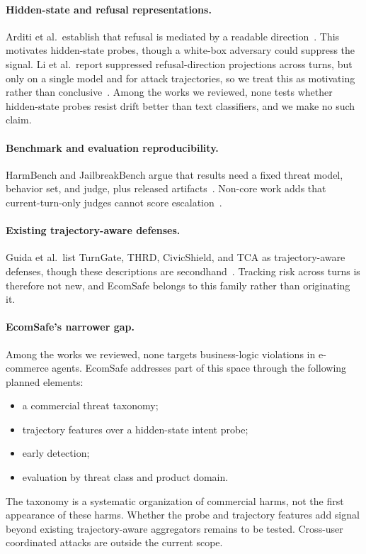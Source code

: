 \documentclass[sigconf,nonacm]{acmart}
\begin{document}
\paragraph{Hidden-state and refusal representations.}
Arditi et al.\ establish that refusal is mediated by a readable direction~\cite{arditi2024refusal}. This motivates hidden-state probes, though a white-box adversary could suppress the signal. Li et al.\ report suppressed refusal-direction projections across turns, but only on a single model and for attack trajectories, so we treat this as motivating rather than conclusive~\cite{li2026state}. Among the works we reviewed, none tests whether hidden-state probes resist drift better than text classifiers, and we make no such claim.

\paragraph{Benchmark and evaluation reproducibility.}
HarmBench and JailbreakBench argue that results need a fixed threat model, behavior set, and judge, plus released artifacts~\cite{mazeika2024harmbench,chao2024jailbreakbench}. Non-core work adds that current-turn-only judges cannot score escalation~\cite{sheoran2026multiturnpsb}.

\paragraph{Existing trajectory-aware defenses.}
Guida et al.\ list TurnGate, THRD, CivicShield, and TCA as trajectory-aware defenses, though these descriptions are secondhand~\cite{guida2026cognitive}. Tracking risk across turns is therefore not new, and EcomSafe belongs to this family rather than originating it.

\paragraph{EcomSafe's narrower gap.}
Among the works we reviewed, none targets business-logic violations in e-commerce agents. EcomSafe addresses part of this space through the following planned elements:
\begin{itemize}
  \item a commercial threat taxonomy;
  \item trajectory features over a hidden-state intent probe;
  \item early detection;
  \item evaluation by threat class and product domain.
\end{itemize}
The taxonomy is a systematic organization of commercial harms, not the first appearance of these harms. Whether the probe and trajectory features add signal beyond existing trajectory-aware aggregators remains to be tested. Cross-user coordinated attacks are outside the current scope.
\end{document}
